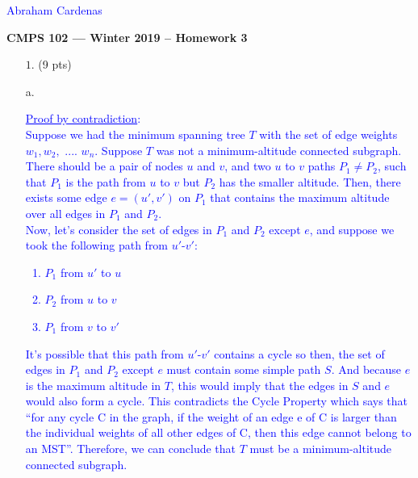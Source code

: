 \documentclass[11pt]{article}
\renewcommand{\blacksquare}{\textcolor{blue}{\openbox}}
\begin{document}
\textcolor{blue}{\hfill Abraham Cardenas} 


\begin{center}
{\bf\Large CMPS 102 --- Winter 2019 --  Homework 3}
\end{center}

\newcommand{\Mod}[1]{\ \mathrm{mod}\ #1}

\begin{itemize}

\item[$1.$] (9 pts)

a.

\textcolor{blue}{ 
\underline{Proof by contradiction}:\\
Suppose we had the minimum spanning tree $T$ with the set of edge weights $w_1, w_2,$ .... $w_n$.  Suppose $T$ was not a minimum-altitude connected subgraph. There should be a pair of nodes $u$ and $v$, and two $u$ to $v$ paths $P_1 \neq P_2$, such that $P_1$ is the path from $u$ to $v$ but $P_2$ has the smaller altitude. Then, there exists some edge $e = (u',v')$ on $P_1$ that contains the maximum altitude over all edges in $P_1$ and $P_2$.\\ 
Now, let's consider the set of edges in $P_1$ and $P_2$ except $e$, and suppose we took the following path from $u'$-$v'$:
\begin{enumerate}
  \item $P_1$ from $u'$ to $u$
  \item $P_2$ from $u$ to $v$
  \item $P_1$ from $v$ to $v'$
\end{enumerate}
It's possible that this path from $u'$-$v'$ contains a cycle so then, the set of edges in $P_1$ and $P_2$ except $e$ must contain some simple path $S$. And because $e$ is the maximum altitude in $T$, this would imply that the edges in $S$ and $e$ would also form a cycle. This contradicts the Cycle Property which says that ``for any cycle C in the graph, if the weight of an edge e of C is larger than the individual weights of all other edges of C, then this edge cannot belong to an MST''. Therefore, we can conclude that $T$ must be a minimum-altitude connected subgraph.\hspace{7.5cm}\blacksquare
}



\end{itemize}
\end{document}
